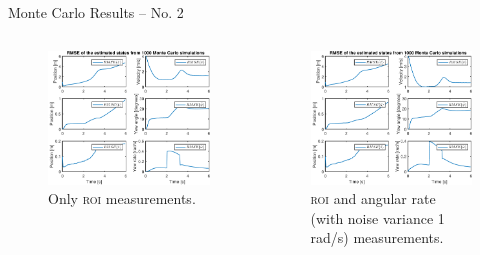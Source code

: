 \documentclass{beamer}
\newcommand{\roi}{\textsc{roi}\xspace}
\begin{document}
\begin{frame}{Monte Carlo Results -- No. 2}
	\begin{columns}[T]
	\begin{figure}
		\includegraphics[width=\textwidth]{MC/13_MC_1000_Rmse}
		\caption{Only \roi measurements.}
	\end{figure}
	\begin{figure}
		\includegraphics[width=\textwidth]{MC/25_MC_1000_Rmse}
		\caption{\roi and angular rate (with noise variance 1 rad/s) measurements.}
	\end{figure}
	\end{columns}
\end{frame}
\end{document}
